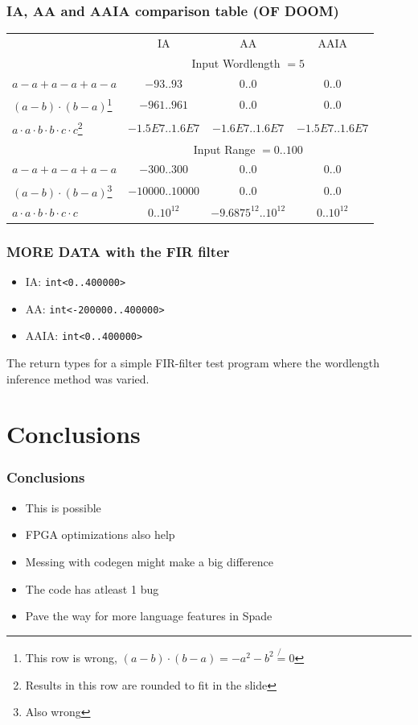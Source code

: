\documentclass{beamer}
\begin{document}
\begin{frame}[containsverbatim]
\frametitle{IA, AA and AAIA comparison table (OF DOOM)}
\footnotesize
\begin{tabular}{l | c c c}
                                  & IA     & AA     & AAIA    \\
                                  & \multicolumn{3}{c}{Input Wordlength $= 5$} \\
  \hline
  $a - a + a - a + a - a$   & $-93..93$ & $0..0$          & $0..0$       \\
  $(a - b) \cdot (b - a)$\footnote[2]{This row is wrong, $(a - b) \cdot (b - a) = -a^2 -b^2 \not{=} 0$} & $-961..961$ & $0..0$           & $0..0$       \\
  $a \cdot a \cdot b \cdot b \cdot c \cdot c$\footnote[1]{Results in this row are rounded to fit in the slide} & $-1.5E7..1.6E7$      & $-1.6E7..1.6E7$      & $-1.5E7..1.6E7$ \\[0.7em]
                                  & \multicolumn{3}{c}{Input Range $= 0..100$} \\
  \hline
  $a - a + a - a + a - a$   & $-300..300$ & $0..0$          & $0..0$       \\
  $(a - b) \cdot (b - a)$\footnote[4]{Also wrong}             & $-10000..10000$ & $0..0$           & $0..0$       \\
  $a \cdot a \cdot b \cdot b \cdot c \cdot c$         & $0..10^{12}$      & $-9.6875^{12}..10^{12}$      & $0..10^{12}$
\end{tabular}
\end{frame}

\begin{frame}[containsverbatim]
\frametitle{MORE DATA with the FIR filter}
\begin{itemize}
  \item IA: \verb+int<0..400000>+
  \item AA: \verb+int<-200000..400000>+
  \item AAIA: \verb+int<0..400000>+
\end{itemize}
The return types for a simple FIR-filter test program where the wordlength inference method was varied.
\end{frame}

\section{Conclusions}

\begin{frame}[containsverbatim]
\frametitle{Conclusions}
\begin{itemize}
  \item This is possible
  \item FPGA  optimizations also help
  \item Messing with codegen might make a big difference
  \item The code has atleast 1 bug
  \item Pave the way for more language features in Spade
\end{itemize}
\end{frame}
\end{document}
